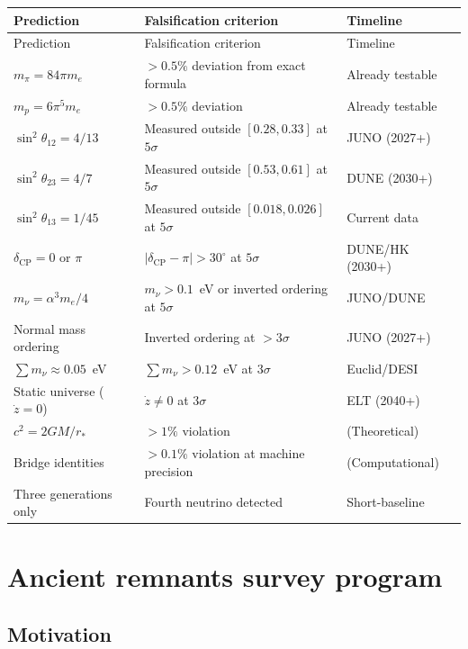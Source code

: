 \documentclass[11pt,letterpaper]{article}
\numberwithin{equation}{section}
\begin{document}
\begin{longtable}{p{4cm}p{4cm}p{4cm}}
\toprule
Prediction & Falsification criterion & Timeline \\
\midrule
\endfirsthead
\toprule
Prediction & Falsification criterion & Timeline \\
\midrule
\endhead
$m_\pi = 84\pi m_e$ & $> 0.5\%$ deviation from exact formula & Already testable \\
$m_p = 6\pi^5 m_e$ & $> 0.5\%$ deviation & Already testable \\
$\sin^2\theta_{12} = 4/13$ & Measured outside $[0.28, 0.33]$ at $5\sigma$ & JUNO (2027+) \\
$\sin^2\theta_{23} = 4/7$ & Measured outside $[0.53, 0.61]$ at $5\sigma$ & DUNE (2030+) \\
$\sin^2\theta_{13} = 1/45$ & Measured outside $[0.018, 0.026]$ at $5\sigma$ & Current data \\
$\delta_\mathrm{CP} = 0$ or $\pi$ & $|\delta_\mathrm{CP} - \pi| > 30^\circ$ at $5\sigma$ & DUNE/HK (2030+) \\
$m_\nu = \alpha^3 m_e/4$ & $m_\nu > 0.1$~eV or inverted ordering at $5\sigma$ & JUNO/DUNE \\
Normal mass ordering & Inverted ordering at $> 3\sigma$ & JUNO (2027+) \\
$\sum m_\nu \approx 0.05$~eV & $\sum m_\nu > 0.12$~eV at $3\sigma$ & Euclid/DESI \\
Static universe ($\dot{z}=0$) & $\dot{z} \neq 0$ at $3\sigma$ & ELT (2040+) \\
$c^2 = 2GM/r_*$ & $> 1\%$ violation & (Theoretical) \\
Bridge identities & $> 0.1\%$ violation at machine precision & (Computational) \\
Three generations only & Fourth neutrino detected & Short-baseline \\
\bottomrule
\end{longtable}

\section{Ancient remnants survey program}
\label{sec:remnants}

\subsection{Motivation}
\end{document}
